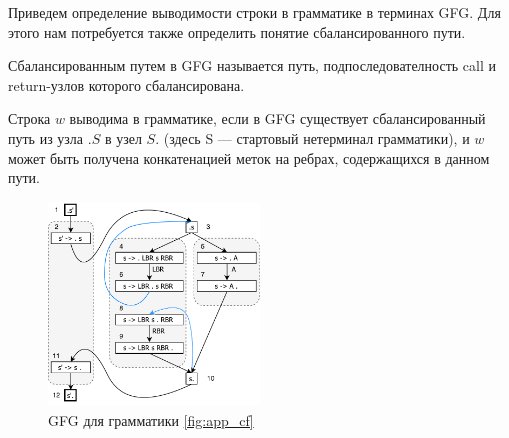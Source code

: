 Приведем определение выводимости строки в грамматике в терминах GFG. Для этого нам потребуется также определить понятие сбалансированного пути.

\begin{definition}
    Сбалансированным путем в GFG называется путь, подпоследователность call и return-узлов которого сбалансирована. 
\end{definition}

\begin{definition}
    Строка $w$ выводима в грамматике, если в GFG существует сбалансированный путь из узла $.S$ в узел $S.$ (здесь S --- стартовый нетерминал грамматики), и $w$ может быть получена конкатенацией меток на ребрах, содержащихся в данном пути. 
\end{definition}



\begin{figure}[h]
    \centering
    \includegraphics[width=0.5\textwidth]{pictures/gfg_enum}
    \caption{GFG для грамматики \ref{fig:app_cf}}
    \label{fig:gfg}
\end{figure}
